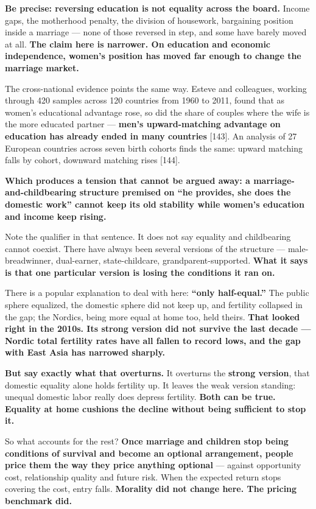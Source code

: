\documentclass[11pt,a4paper]{article}
\begin{document}
\textbf{Be precise: reversing education is not equality across the board.} Income gaps, the motherhood penalty, the division of housework, bargaining position inside a marriage --- none of those reversed in step, and some have barely moved at all. \textbf{The claim here is narrower. On education and economic independence, women's position has moved far enough to change the marriage market.}

The cross-national evidence points the same way. Esteve and colleagues, working through 420 samples across 120 countries from 1960 to 2011, found that as women's educational advantage rose, so did the share of couples where the wife is the more educated partner --- \textbf{men's upward-matching advantage on education has already ended in many countries}{} [143]. An analysis of 27 European countries across seven birth cohorts finds the same: upward matching falls by cohort, downward matching rises [144].

\textbf{Which produces a tension that cannot be argued away: a marriage-and-childbearing structure premised on ``he provides, she does the domestic work'' cannot keep its old stability while women's education and income keep rising.}

Note the qualifier in that sentence. It does not say equality and childbearing cannot coexist. There have always been several versions of the structure --- male-breadwinner, dual-earner, state-childcare, grandparent-supported. \textbf{What it says is that one particular version is losing the conditions it ran on.}

There is a popular explanation to deal with here: \textbf{``only half-equal.''} The public sphere equalized, the domestic sphere did not keep up, and fertility collapsed in the gap; the Nordics, being more equal at home too, held theirs. \textbf{That looked right in the 2010s. Its strong version did not survive the last decade --- Nordic total fertility rates have all fallen to record lows, and the gap with East Asia has narrowed sharply.}

\textbf{But say exactly what that overturns.} It overturns the \textbf{strong version}, that domestic equality alone holds fertility up. It leaves the weak version standing: unequal domestic labor really does depress fertility. \textbf{Both can be true. Equality at home cushions the decline without being sufficient to stop it.}

So what accounts for the rest? \textbf{Once marriage and children stop being conditions of survival and become an optional arrangement, people price them the way they price anything optional} --- against opportunity cost, relationship quality and future risk. When the expected return stops covering the cost, entry falls. \textbf{Morality did not change here. The pricing benchmark did.}
\end{document}
